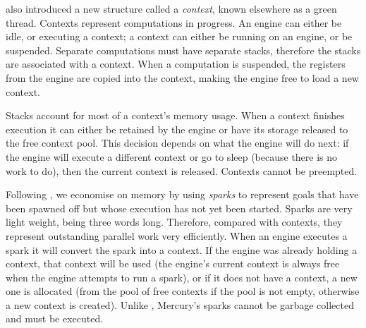 \citet{conway:2002:par} also introduced a new structure called a
\emph{context}, known elsewhere as a green thread.
Contexts represent computations in progress.
An engine can either be idle, or executing a context;
a context can either be running on an engine, or be suspended.
Separate computations must have separate stacks,
therefore the stacks are associated with a context.
When a computation is suspended,
the registers from the engine are copied into the context,
making the engine free to load a new context.

Stacks account for most of a context's memory usage.
When a context finishes execution
it can either be retained by the engine or
have its storage released to the free context pool.
This decision depends on what the engine will do next:
if the engine will execute a different context or go to sleep
(because there is no work to do),
then the current context is released.
Contexts cannot be preempted.

Following \citet{simonmar_2009_multicore_rts},
we economise on memory by using \emph{sparks}
to represent goals that have been spawned off
but whose execution has not yet been started.
Sparks are very light weight,
being three words long.
Therefore, compared with contexts,
they represent outstanding parallel work very efficiently.
When an engine executes a spark it will convert the spark into a context.
If the engine was already holding a context,
that context will be used
(the engine's current context is always free when the engine attempts to run
a spark),
or if it does not have a context,
a new one is allocated
(from the pool of free contexts if the pool is not empty,
otherwise a new context is created).
Unlike \citet{simonmar_2009_multicore_rts},
Mercury's sparks cannot be garbage collected and must be executed.

